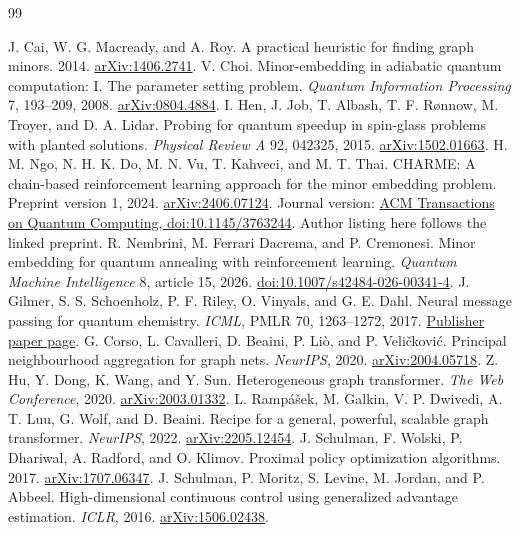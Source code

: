 \begin{thebibliography}{99}
 J. Cai, W. G. Macready, and A. Roy. A practical heuristic for finding graph minors. 2014. \href{https://arxiv.org/abs/1406.2741}{arXiv:1406.2741}.
 V. Choi. Minor-embedding in adiabatic quantum computation: I. The parameter setting problem. \emph{Quantum Information Processing} 7, 193--209, 2008. \href{https://arxiv.org/abs/0804.4884}{arXiv:0804.4884}.
 I. Hen, J. Job, T. Albash, T. F. R\o nnow, M. Troyer, and D. A. Lidar. Probing for quantum speedup in spin-glass problems with planted solutions. \emph{Physical Review A} 92, 042325, 2015. \href{https://arxiv.org/abs/1502.01663}{arXiv:1502.01663}.
 H. M. Ngo, N. H. K. Do, M. N. Vu, T. Kahveci, and M. T. Thai. CHARME: A chain-based reinforcement learning approach for the minor embedding problem. Preprint version 1, 2024. \href{https://arxiv.org/abs/2406.07124}{arXiv:2406.07124}. Journal version: \href{https://doi.org/10.1145/3763244}{ACM Transactions on Quantum Computing, doi:10.1145/3763244}. Author listing here follows the linked preprint.
 R. Nembrini, M. Ferrari Dacrema, and P. Cremonesi. Minor embedding for quantum annealing with reinforcement learning. \emph{Quantum Machine Intelligence} 8, article 15, 2026. \href{https://doi.org/10.1007/s42484-026-00341-4}{doi:10.1007/s42484-026-00341-4}.
 J. Gilmer, S. S. Schoenholz, P. F. Riley, O. Vinyals, and G. E. Dahl. Neural message passing for quantum chemistry. \emph{ICML}, PMLR 70, 1263--1272, 2017. \href{https://proceedings.mlr.press/v70/gilmer17a.html}{Publisher paper page}.
 G. Corso, L. Cavalleri, D. Beaini, P. Li\`o, and P. Veli\v{c}kovi\'c. Principal neighbourhood aggregation for graph nets. \emph{NeurIPS}, 2020. \href{https://arxiv.org/abs/2004.05718}{arXiv:2004.05718}.
 Z. Hu, Y. Dong, K. Wang, and Y. Sun. Heterogeneous graph transformer. \emph{The Web Conference}, 2020. \href{https://arxiv.org/abs/2003.01332}{arXiv:2003.01332}.
 L. Ramp\'a\v{s}ek, M. Galkin, V. P. Dwivedi, A. T. Luu, G. Wolf, and D. Beaini. Recipe for a general, powerful, scalable graph transformer. \emph{NeurIPS}, 2022. \href{https://arxiv.org/abs/2205.12454}{arXiv:2205.12454}.
 J. Schulman, F. Wolski, P. Dhariwal, A. Radford, and O. Klimov. Proximal policy optimization algorithms. 2017. \href{https://arxiv.org/abs/1707.06347}{arXiv:1707.06347}.
 J. Schulman, P. Moritz, S. Levine, M. Jordan, and P. Abbeel. High-dimensional continuous control using generalized advantage estimation. \emph{ICLR}, 2016. \href{https://arxiv.org/abs/1506.02438}{arXiv:1506.02438}.

\end{thebibliography}
